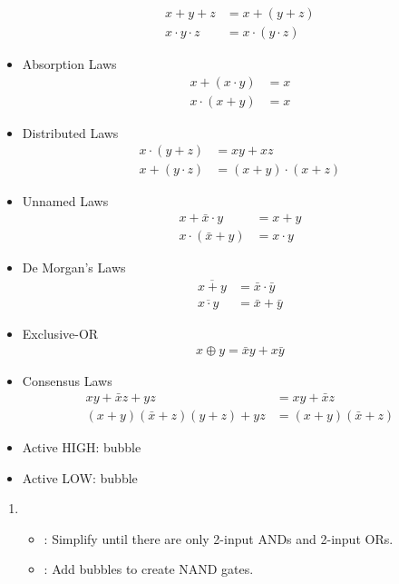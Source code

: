 \begin{multicols}{4}
\begin{itemize}
\begin{align*}
          x + y + z &= x + (y + z) \\
          x \cdot y \cdot z &= x \cdot (y \cdot z)
        \end{align*}
      \item{Absorption Laws}
        \begin{align*}
          x + (x \cdot y) &= x \\
          x \cdot (x + y) &= x
        \end{align*}
      \item{Distributed Laws}
        \begin{align*}
          x \cdot (y + z) &= xy + xz \\
          x + (y \cdot z) &= (x + y) \cdot (x + z)
        \end{align*}
      \item{Unnamed Laws}
        \begin{align*}
          x + \bar{x} \cdot y &= x + y \\
          x \cdot (\bar{x} + y) &= x \cdot y
        \end{align*}
      \item{De Morgan's Laws}
        \begin{align*}
          \overline{x + y} &= \bar{x} \cdot \bar{y} \\
          \overline{x \cdot y} &= \bar{x} + \bar{y}
        \end{align*}
      \item{Exclusive-OR}
        \begin{align*}
          x \oplus y = \bar{x}y + x\bar{y}
        \end{align*}
      \item{Consensus Laws}
        \begin{align*}
          xy + \bar{x} z + yz &= xy + \bar{x} z \\
          (x + y)(\bar{x} + z)(y + z) + yz &= (x + y)(\bar{x} + z)
        \end{align*}
    \end{itemize}

    \begin{itemize}
      \item Active HIGH:  bubble
      \item Active LOW:  bubble
    \end{itemize}

    \begin{enumerate}
      \item {}
        \begin{itemize}
          \item {}: Simplify until there are only
            2-input ANDs and 2-input ORs.
          \item {}: Add bubbles to create NAND gates.
        \end{itemize}
    \end{enumerate}

\end{multicols}